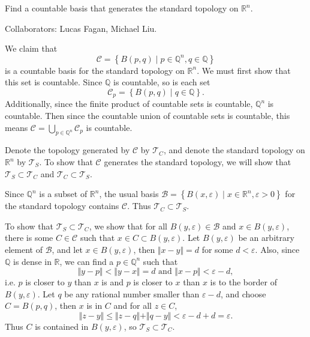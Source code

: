 \documentclass[11pt]{article}
\begin{document}
\begin{exer}[5 points]
	Find a countable basis that generates the standard topology on $\mathbb{R}^n$.
\end{exer}
{\color{blue}Collaborators: Lucas Fagan, Michael Liu.}

We claim that
\[
	\mathcal{C} = \left\{ B\left(p, q\right) \;|\; p \in \mathbb{Q}^n, q \in \mathbb{Q} \right\}
	\] is a countable basis for the standard topology on $\mathbb{R}^n$. We must first show that this set is countable. Since $\mathbb{Q}$ is countable, so is each set
	\[
	\mathcal{C}_{p} = \left\{ B(p, q) \;|\; q \in \mathbb{Q} \right\}.
	\] Additionally, since the finite product of countable sets is countable, $\mathbb{Q}^n$ is countable. Then since the countable union of countable sets is countable, this means $\mathcal{C} = \bigcup_{p \in \mathbb{Q}^n} \mathcal{C}_{p}$ is countable.

Denote the topology generated by $\mathcal{C}$ by $\mathcal{T}_C$, and denote the standard topology on $\mathbb{R}^n$ by $\mathcal{T}_S$. To show that $\mathcal{C}$ generates the standard topology, we will show that $\mathcal{T}_S \subset \mathcal{T}_C$ and $\mathcal{T}_C \subset \mathcal{T}_S$.

Since $\mathbb{Q}^n$ is a subset of $\mathbb{R}^n$, the usual basis $\mathcal{B} = \left\{ B(x, \varepsilon) \;|\; x \in \mathbb{R}^n, \varepsilon > 0 \right\}$ for the standard topology contains $\mathcal{C}$. Thus $\mathcal{T}_C \subset \mathcal{T}_S$.

To show that $\mathcal{T}_S \subset \mathcal{T}_C$, we show that for all $B(y, \varepsilon) \in \mathcal{B}$ and $x \in B(y,\varepsilon)$, there is some $C \in \mathcal{C}$ such that $x \in C \subset B(y,\varepsilon)$. Let $B(y,\varepsilon)$ be an arbitrary element of $\mathcal{B}$, and let $x \in B(y, \varepsilon)$, then $\Vert{x-y}\Vert=d$ for some $d < \varepsilon$. Also, since $\mathbb{Q}$ is dense in $\mathbb{R}$, we can find a $p \in \mathbb{Q}^n$ such that
\[
	\Vert{y-p}\Vert < \Vert{y-x}\Vert = d \text{ and } \Vert{x-p}\Vert<\varepsilon-d,
\] i.e. $p$ is closer to $y$ than $x$ is and $p$ is closer to $x$ than $x$ is to the border of $B(y, \varepsilon)$. Let $q$ be any rational number smaller than $\varepsilon-d$, and choose $C = B(p,q)$, then $x$ is in $C$ and for all $z \in C$,
\[
\Vert{z-y}\Vert\leq \Vert{z-q}\Vert+\Vert{q-y}\Vert < \varepsilon-d+d = \varepsilon.
\] Thus $C$ is contained in $B(y,\varepsilon)$, so $\mathcal{T}_{S} \subset \mathcal{T}_{C}$.
\end{document}
